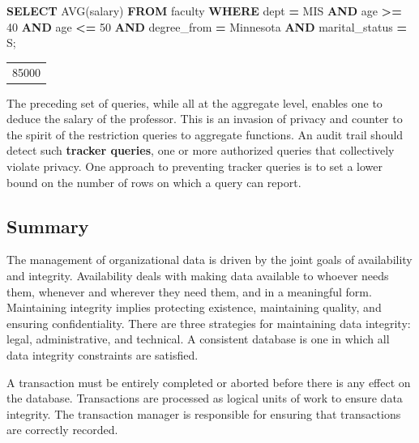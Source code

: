 \documentclass[
]{article}
\newenvironment{Shaded}{\begin{snugshade}}{\end{snugshade}}
\newcommand{\DecValTok}[1]{\textcolor[rgb]{0.00,0.00,0.81}{#1}}
\newcommand{\FunctionTok}[1]{\textcolor[rgb]{0.00,0.00,0.00}{#1}}
\newcommand{\KeywordTok}[1]{\textcolor[rgb]{0.13,0.29,0.53}{\textbf{#1}}}
\newcommand{\NormalTok}[1]{#1}
\newcommand{\OperatorTok}[1]{\textcolor[rgb]{0.81,0.36,0.00}{\textbf{#1}}}
\newcommand{\StringTok}[1]{\textcolor[rgb]{0.31,0.60,0.02}{#1}}
\begin{document}
\begin{Shaded}
\begin{Highlighting}[]
\KeywordTok{SELECT} \FunctionTok{AVG}\NormalTok{(salary) }\KeywordTok{FROM}\NormalTok{ faculty}
    \KeywordTok{WHERE}\NormalTok{ dept }\OperatorTok{=} \StringTok{\textquotesingle{}MIS\textquotesingle{}}
    \KeywordTok{AND}\NormalTok{ age }\OperatorTok{\textgreater{}=} \DecValTok{40} \KeywordTok{AND}\NormalTok{ age }\OperatorTok{\textless{}=} \DecValTok{50}
    \KeywordTok{AND}\NormalTok{ degree\_from }\OperatorTok{=} \StringTok{\textquotesingle{}Minnesota\textquotesingle{}}
    \KeywordTok{AND}\NormalTok{ marital\_status }\OperatorTok{=} \StringTok{\textquotesingle{}S\textquotesingle{}}\NormalTok{; }
\end{Highlighting}
\end{Shaded}

\begin{longtable}[]{@{}l@{}}
\toprule
 \\
\midrule
\endhead
85000 \\
\bottomrule
\end{longtable}

The preceding set of queries, while all at the aggregate level, enables
one to deduce the salary of the professor. This is an invasion of
privacy and counter to the spirit of the restriction queries to
aggregate functions. An audit trail should detect such \textbf{tracker
queries}, one or more authorized queries that collectively violate
privacy. One approach to preventing tracker queries is to set a lower
bound on the number of rows on which a query can report.

\hypertarget{summary-15}{%
\subsection*{Summary}\label{summary-15}}

The management of organizational data is driven by the joint goals of
availability and integrity. Availability deals with making data
available to whoever needs them, whenever and wherever they need them,
and in a meaningful form. Maintaining integrity implies protecting
existence, maintaining quality, and ensuring confidentiality. There are
three strategies for maintaining data integrity: legal, administrative,
and technical. A consistent database is one in which all data integrity
constraints are satisfied.

A transaction must be entirely completed or aborted before there is any
effect on the database. Transactions are processed as logical units of
work to ensure data integrity. The transaction manager is responsible
for ensuring that transactions are correctly recorded.
\end{document}
